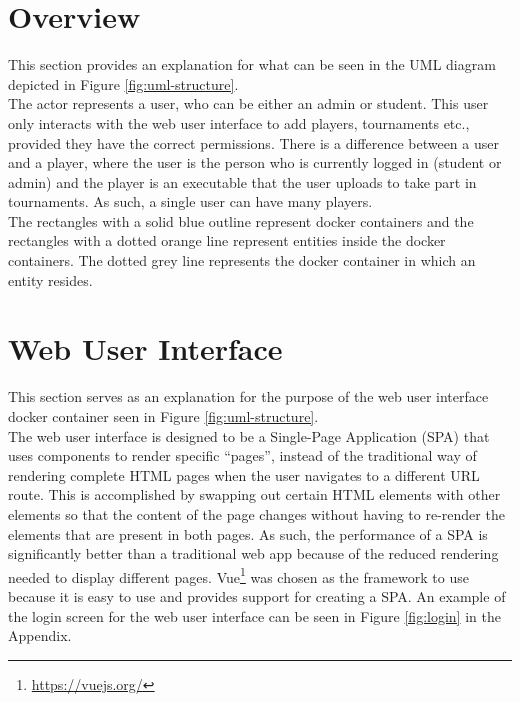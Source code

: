 \documentclass[a4paper, 11pt]{report}
\begin{document}
\section{Overview}
\label{sec:impl-overview}

This section provides an explanation for what can be seen in the UML diagram
depicted in Figure \ref{fig:uml-structure}. \\

The actor represents a user, who can be either an admin or student. This user
only interacts with the web user interface to add players, tournaments etc.,
provided they have the correct permissions. There is a difference between a
user and a player, where the user is the person who is currently logged in
(student or admin) and the player is an executable that the user uploads to take
part in tournaments. As such, a single user can have many players. \\

The rectangles with a solid blue outline represent docker containers and the
rectangles with a dotted orange line represent entities inside the docker
containers. The dotted grey line represents the docker container in which an
entity resides.

\section{Web User Interface}
\label{sec:impl-web-interface}

This section serves as an explanation for the purpose of the web user interface
docker container seen in Figure \ref{fig:uml-structure}. \\

The web user interface is designed to be a Single-Page Application (SPA) that
uses components to render specific ``pages'', instead of the traditional way of
rendering complete HTML pages when the user navigates to a different URL route.
This is accomplished by swapping out certain HTML elements with other elements
so that the content of the page changes without having to re-render the elements
that are present in both pages. As such, the performance of a SPA is significantly
better than a traditional web app because of the reduced rendering needed to
display different pages. Vue\footnote{\url{https://vuejs.org/}} was chosen as the
framework to use because it is easy to use and provides support for creating a
SPA. An example of the login screen for the web user interface can be seen in
Figure \ref{fig:login} in the Appendix. \\
\end{document}
